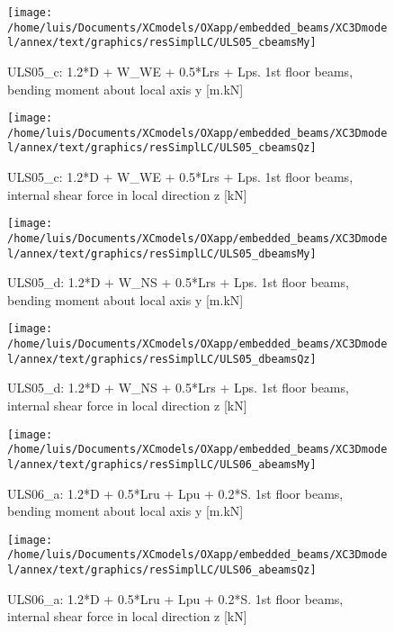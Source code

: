 \clearpage
\begin{figure}
\begin{center}
\texttt{[image: /home/luis/Documents/XCmodels/OXapp/embedded\_beams/XC3Dmodel/annex/text/graphics/resSimplLC/ULS05\_cbeamsMy]}
\caption{ULS05_c: 1.2*D + W_WE + 0.5*Lrs + Lps. 1st floor beams, bending moment about local axis y [m.kN]}
\end{center}
\end{figure}
\begin{figure}
\begin{center}
\texttt{[image: /home/luis/Documents/XCmodels/OXapp/embedded\_beams/XC3Dmodel/annex/text/graphics/resSimplLC/ULS05\_cbeamsQz]}
\caption{ULS05_c: 1.2*D + W_WE + 0.5*Lrs + Lps. 1st floor beams, internal shear force in local direction z [kN]}
\end{center}
\end{figure}
\clearpage
\begin{figure}
\begin{center}
\texttt{[image: /home/luis/Documents/XCmodels/OXapp/embedded\_beams/XC3Dmodel/annex/text/graphics/resSimplLC/ULS05\_dbeamsMy]}
\caption{ULS05_d: 1.2*D + W_NS + 0.5*Lrs + Lps. 1st floor beams, bending moment about local axis y [m.kN]}
\end{center}
\end{figure}
\begin{figure}
\begin{center}
\texttt{[image: /home/luis/Documents/XCmodels/OXapp/embedded\_beams/XC3Dmodel/annex/text/graphics/resSimplLC/ULS05\_dbeamsQz]}
\caption{ULS05_d: 1.2*D + W_NS + 0.5*Lrs + Lps. 1st floor beams, internal shear force in local direction z [kN]}
\end{center}
\end{figure}
\clearpage
\begin{figure}
\begin{center}
\texttt{[image: /home/luis/Documents/XCmodels/OXapp/embedded\_beams/XC3Dmodel/annex/text/graphics/resSimplLC/ULS06\_abeamsMy]}
\caption{ULS06_a: 1.2*D + 0.5*Lru + Lpu + 0.2*S. 1st floor beams, bending moment about local axis y [m.kN]}
\end{center}
\end{figure}
\begin{figure}
\begin{center}
\texttt{[image: /home/luis/Documents/XCmodels/OXapp/embedded\_beams/XC3Dmodel/annex/text/graphics/resSimplLC/ULS06\_abeamsQz]}
\caption{ULS06_a: 1.2*D + 0.5*Lru + Lpu + 0.2*S. 1st floor beams, internal shear force in local direction z [kN]}
\end{center}
\end{figure}
